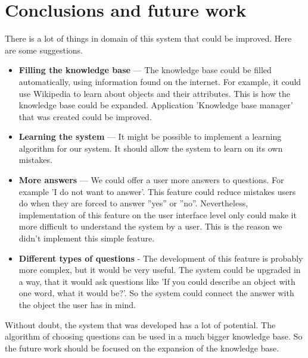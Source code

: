 \documentclass[a4paper]{article}
\begin{document}
\section{Conclusions and future work}
There is a lot of things in domain of this system that could be improved. Here are some suggestions.
\begin{itemize}
\item\textbf{Filling the knowledge base} --- The knowledge base could be filled automatically, using information found on the internet. For example, it could use Wikipedia to learn about objects and their attributes. This is how the knowledge base could be expanded. Application 'Knowledge base manager' that was created could be improved. 
\item\textbf{Learning the system} --- It might be possible to implement a learning algorithm for our system. It should allow the system to learn on its own mistakes.
\item\textbf{More answers} --- We could offer a user more answers to questions. For example 'I do not want to answer'. This feature could reduce mistakes users do when they are forced to answer ''yes'' or ''no''. Nevertheless, implementation of this feature on the user interface level only could make it more difficult to understand the system by a user. This is the reason we didn't implement this simple feature.
\item\textbf{Different types of questions} - The development of this feature is probably more complex, but it would be very useful. The system could be upgraded in a way, that it would ask questions like 'If you could describe an object with one word, what it would be?'. So the system could connect the answer with the object the user has in mind.
\end{itemize}
Without doubt, the system that was developed has a lot of potential. The algorithm of choosing questions can be used in a much bigger knowledge base. So the future work should be focused on the expansion of the knowledge base. 
\end{document}
